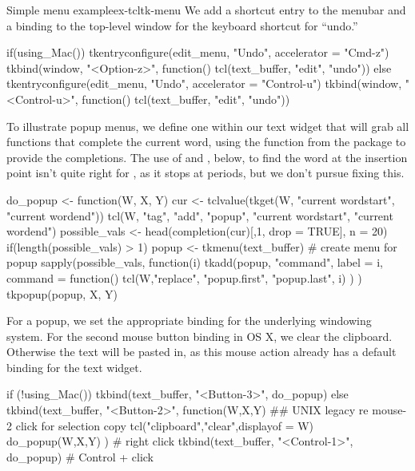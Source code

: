 \begin{example}{Simple menu example}{ex-tcltk-menu}
We add a shortcut entry to the menubar and a binding to the
top-level window for the keyboard shortcut for ``undo.''
\begin{Schunk}
\begin{Sinput}
 if(using_Mac()) {
   tkentryconfigure(edit_menu, "Undo", accelerator = "Cmd-z")
   tkbind(window, "<Option-z>", function() tcl(text_buffer, "edit", "undo"))
 } else {
   tkentryconfigure(edit_menu, "Undo", accelerator = "Control-u")
   tkbind(window, "<Control-u>", function() tcl(text_buffer, "edit", "undo"))
 }
\end{Sinput}
\end{Schunk}
%

To illustrate popup menus, we define one within our text widget that
will grab all functions that complete the current word, using the
 function from the  package to
provide the completions.  The use of  and
, below, to find the word at the insertion point
isn't quite right for \R, as it stops at periods, but we don't pursue
fixing this.
\begin{Schunk}
\begin{Sinput}
 do_popup <- function(W, X, Y) {
   cur <- tclvalue(tkget(W, "current  wordstart", 
                            "current wordend"))
   tcl(W, "tag", "add", "popup", "current  wordstart", 
                                 "current wordend")
   possible_vals <- head(completion(cur)[,1, drop = TRUE], n = 20)
   if(length(possible_vals) > 1) {
     popup <- tkmenu(text_buffer)                # create menu for popup
     sapply(possible_vals, function(i) {         
       tkadd(popup, "command", label = i, command = function() {
         tcl(W,"replace", "popup.first", "popup.last", i)
       })
     })
     tkpopup(popup, X, Y)
  }}
\end{Sinput}
\end{Schunk}

For a popup, we set the appropriate binding for the underlying
windowing system. For the second mouse button binding in OS X, we
clear the clipboard. Otherwise the text  will be pasted in, as this mouse
action already has a default binding for the text widget.

\begin{Schunk}
\begin{Sinput}
 if (!using_Mac()) {
   tkbind(text_buffer, "<Button-3>", do_popup)
 } else {
   tkbind(text_buffer, "<Button-2>", function(W,X,Y) {
     ## UNIX legacy re mouse-2 click for selection copy
     tcl("clipboard","clear",displayof = W) 
     do_popup(W,X,Y)
     })      # right click
   tkbind(text_buffer, "<Control-1>", do_popup)     # Control + click
 }
\end{Sinput}
\end{Schunk}
\end{example}



